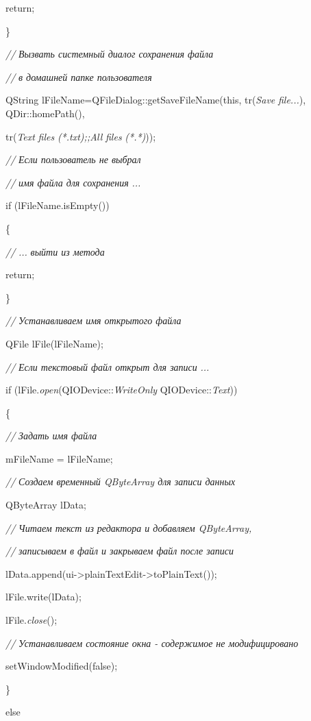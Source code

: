  return;

\}

\textit{//} \textit{Вызвать системный диалог сохранения файла}\textit{ }

\textit{//} \textit{в домашней папке пользователя}

QString lFileName=QFileDialog::getSaveFileName(this, tr(\textit{Save} \textit{file...}),
QDir::homePath(),

 tr(\textit{Text} \textit{files} \textit{(*.txt);;All} \textit{files} \textit{(*.*)}));

\textit{//} \textit{Если пользователь не выбрал}\textit{ }

\textit{//} \textit{имя файла для сохранения}\textit{ }\textit{...}

if (lFileName.isEmpty())

\{

\textit{//} \textit{...} \textit{выйти из метода}\textit{ }

 return;

\}

\textit{//} \textit{Устанавливаем имя открытого файла}\textit{ }

QFile lFile(lFileName);

\textit{//} \textit{Если текстовый файл открыт для записи}\textit{ }\textit{...}

if (lFile.\textit{open}(QIODevice::\textit{WriteOnly} {\textbar} QIODevice::\textit{Text}))

 \{

\textit{//} \textit{Задать имя файла}\textit{ }

 mFileName = lFileName;

\textit{//} \textit{Создаем временный QByteArray для записи данных}\textit{ }

 QByteArray lData;

\textit{//} \textit{Читаем текст из редактора и добавляем QByteArray,}

\textit{//} \textit{записываем в файл и закрываем файл после записи}\textit{ }

 lData.append(ui-{>}plainTextEdit-{>}toPlainText());

 lFile.write(lData);

 lFile.\textit{close}();

\textit{//} \textit{Устанавливаем состояние окна - содержимое не модифицировано}

 setWindowModified(false);

\}

else

